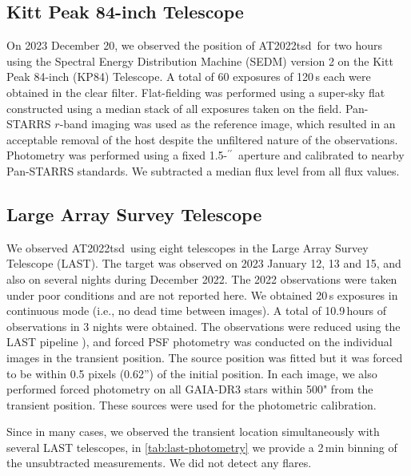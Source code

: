 \documentclass{nature_plusfigure}
\newcommand{\at}{AT2022tsd}
\newcommand{\ayqh}[1]{{\textcolor{red}{\texttt{AYQH: #1}}}}
\newcommand{\arcsec}{$^{\prime\prime}$}
\begin{document}
\begin{methods}
\subsection{Kitt Peak 84-inch Telescope}
\label{sec:kp84}

On 2023 December 20, we observed the position of \at\ for two hours using the Spectral Energy Distribution Machine (SEDM\cite{Blagorodnova2018}) version 2 on the Kitt Peak 84-inch (KP84) Telescope. A total of 60 exposures of 120\,s each were obtained in the clear filter. Flat-fielding was performed using a super-sky flat constructed using a median stack of all exposures taken on the field.  Pan-STARRS $r$-band imaging was used as the reference image, which resulted in an acceptable removal of the host despite the unfiltered nature of the observations.  Photometry was performed using a fixed 1.5-\arcsec\ aperture and calibrated to nearby Pan-STARRS standards. We subtracted a median flux level from all flux values.

\subsection{Large Array Survey Telescope}
\label{sec:last}

We observed \at\ using eight telescopes in the Large Array Survey Telescope (LAST\cite{Ofek2023,BenAmi2023}).
The target was observed on 2023 January 12, 13 and 15, and also on several nights during December 2022.
The 2022 observations were taken under poor conditions and are not reported here.
We obtained 20\,s exposures in continuous mode (i.e., no dead time between images).
A total of 10.9\,hours of observations in 3 nights were obtained.
The observations were reduced using the LAST pipeline \cite{Ofek2014,Ofek2019,Ofek2023}), and forced PSF photometry was conducted on the individual images
in the transient position. 
The source position was fitted but it was forced to be within 0.5 pixels (0.62'') of the initial position.
In each image, we also performed forced photometry on all GAIA-DR3\cite{Gaia2021} stars
within 500" from the transient position.
These sources were used for the photometric calibration.

Since in many cases, we observed the transient location simultaneously with several LAST telescopes, in \ref{tab:last-photometry} we provide a 2\,min binning of the unsubtracted measurements. We did not detect any flares.



\end{methods}
\end{document}
